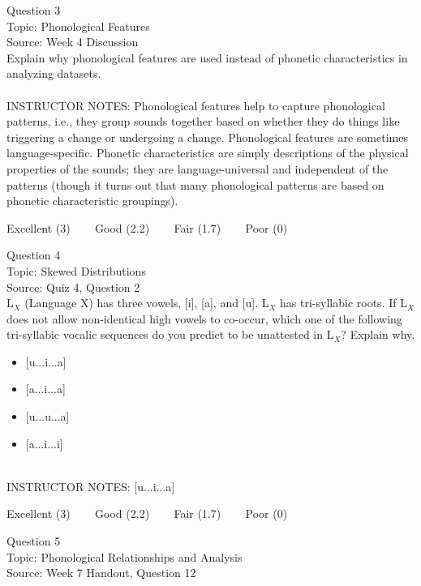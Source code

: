 \documentclass[12pt]{article}
\begin{document}
{\large Question 3}\\

Topic: Phonological Features\\
Source: Week 4 Discussion\\

Explain why phonological features are used instead of phonetic characteristics in analyzing datasets.\\


~\\
INSTRUCTOR NOTES: Phonological features help to capture phonological patterns, i.e., they group sounds together based on whether they do things like triggering a change or undergoing a change. Phonological features are sometimes language-specific. Phonetic characteristics are simply descriptions of the physical properties of the sounds; they are language-universal and independent of the patterns (though it turns out that many phonological patterns are based on phonetic characteristic groupings).


\vfill
Excellent (3) ~~~ Good (2.2) ~~~ Fair (1.7) ~~~ Poor (0)
\newpage

{\large Question 4}\\

Topic: Skewed Distributions\\
Source: Quiz 4, Question 2\\

L$_X$ (Language X) has three vowels, [i], [a], and [u]. L$_X$ has tri-syllabic roots. If L$_X$ does not allow non-identical high vowels to co-occur, which one of the following tri-syllabic vocalic sequences do you predict to be unattested in L$_X$? Explain why.\\

\begin{itemize} \item {[u...i...a]} \item {[a...i...a]} \item {[u...u...a]} \item {[a...i...i]} \end{itemize}


~\\
INSTRUCTOR NOTES: [u...i...a]


\vfill
Excellent (3) ~~~ Good (2.2) ~~~ Fair (1.7) ~~~ Poor (0)
\newpage

{\large Question 5}\\

Topic: Phonological Relationships and Analysis\\
Source: Week 7 Handout, Question 12\\
\end{document}
